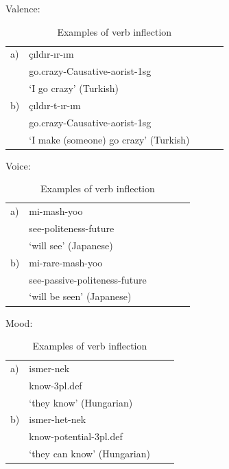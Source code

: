 \documentclass[11pt,letterpaper]{article}
\begin{document}
 
 \begin{table}[]
     Valence:
\begin{tabular}{lllll}
a) & çıldır-ır-ım \\
& go.crazy-Causative-aorist-1sg \\
& `I go crazy' (Turkish)\\
b) & çıldır-t-ır-ım \\
& go.crazy-Causative-aorist-1sg \\
& `I make (someone) go crazy' (Turkish) \\
\end{tabular}     
Voice:
\begin{tabular}{llllll}
a) & mi-mash-yoo \\
& see-politeness-future \\
& `will see' (Japanese) \\
b) & mi-rare-mash-yoo \\
& see-passive-politeness-future \\
&`will be seen' (Japanese)
\end{tabular}

Mood:

\begin{tabular}{llll}
a) & ismer-nek \\
& know-3pl.def \\
& `they know' (Hungarian) \\
b) & ismer-het-nek \\
& know-potential-3pl.def \\
& `they can know' (Hungarian)
\end{tabular}
\caption{Examples of verb inflection}
     \label{tab:examples-verbs}
 \end{table}
 
\end{document}
